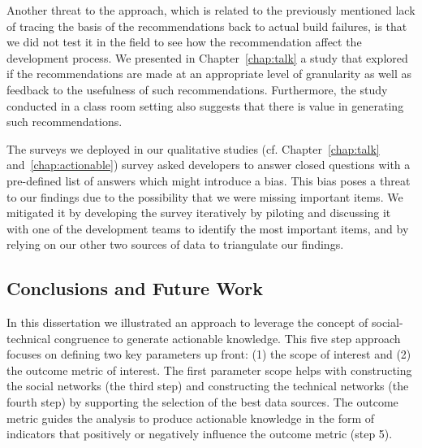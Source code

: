 
Another threat to the approach, which is related to the previously mentioned lack of tracing the basis of the recommendations back to actual build failures, is that we did not test it in the field to see how the recommendation affect the development process.
We presented in Chapter~\ref{chap:talk} a study that explored if the recommendations are made at an appropriate level of granularity as well as feedback to the usefulness of such recommendations.
Furthermore, the study conducted in a class room setting also suggests that there is value in generating such recommendations.

The surveys we deployed in our qualitative studies (cf. Chapter~\ref{chap:talk} and~\ref{chap:actionable}) survey asked developers to answer closed questions with a pre-defined list of answers which might introduce a bias.
This bias poses a threat to our findings due to the possibility that we were missing important items.
We mitigated it by developing the survey iteratively by piloting and discussing it with one of the development teams to identify the most important items, and by relying on our other two sources of data to triangulate our findings.











\subsection{Conclusions and Future Work}
\label{ch:dis:con}
In this dissertation we illustrated an approach to leverage the concept of social-technical congruence to generate actionable knowledge.
This five step approach focuses on defining two key parameters up front: (1) the scope of interest and (2) the outcome metric of interest.
The first parameter scope helps with constructing the social networks (the third step) and constructing the technical networks (the fourth step) by supporting the selection of the best data sources.
The outcome metric guides the analysis to produce actionable knowledge in the form of indicators that positively or negatively influence the outcome metric (step 5). 

